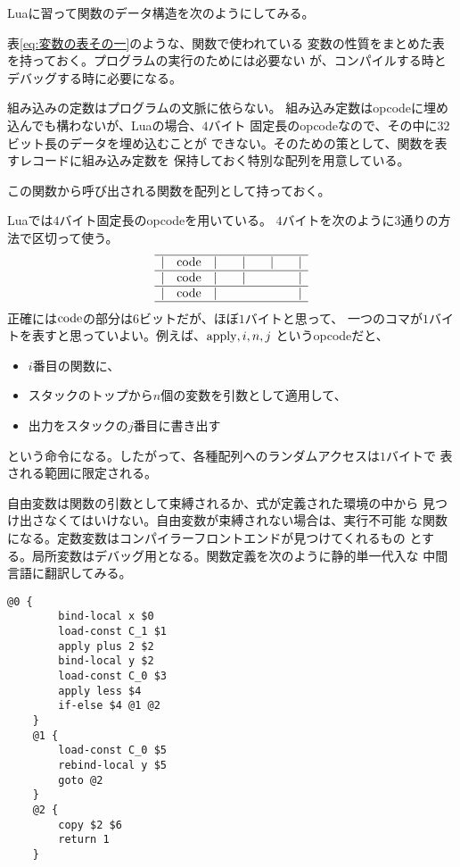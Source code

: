 {	Luaに習って関数のデータ構造を次のようにしてみる。
	\begin{description}\setlength{\itemsep}{-1mm} %
		\item[変数の表] 表\ref{eq:変数の表その一}のような、関数で使われている
		変数の性質をまとめた表を持っておく。プログラムの実行のためには必要ない
		が、コンパイルする時とデバッグする時に必要になる。
		\item[組み込み定数の配列] 組み込みの定数はプログラムの文脈に依らない。
		組み込み定数はopcodeに埋め込んでも構わないが、Luaの場合、$4$バイト
		固定長のopcodeなので、その中に$32$ビット長のデータを埋め込むことが
		できない。そのための策として、関数を表すレコードに組み込み定数を
		保持しておく特別な配列を用意している。
		\item[関数の配列] この関数から呼び出される関数を配列として持っておく。
		\item[opcodeの配列] Luaでは$4$バイト固定長のopcodeを用いている。
		$4$バイトを次のように$3$通りの方法で区切って使う。
		\begin{equation*}\begin{array}{lrrrrr}\hline
			|& {\operatorname{code}} &| \quad &| \quad &| \quad &| \\\hline
			|& {\operatorname{code}} &| \quad &| \quad & \quad &| \\\hline
			|& {\operatorname{code}} &| \quad & \quad & \quad &| \\\hline
		\end{array}\end{equation*}
		正確には${\operatorname{code}}$の部分は$6$ビットだが、ほぼ$1$バイトと思って、
		一つのコマが$1$バイトを表すと思っていよい。例えば、${\operatorname{apply}},i,n,j$
		というopcodeだと、
		\begin{itemize}\setlength{\itemsep}{-1mm} %
			\item $i$番目の関数に、
			\item スタックのトップから$n$個の変数を引数として適用して、
			\item 出力をスタックの$j$番目に書き出す
		\end{itemize} %
		という命令になる。したがって、各種配列へのランダムアクセスは$1$バイトで
		表される範囲に限定される。
	\end{description} %

	自由変数は関数の引数として束縛されるか、式が定義された環境の中から
	見つけ出さなくてはいけない。自由変数が束縛されない場合は、実行不可能
	な関数になる。定数変数はコンパイラーフロントエンドが見つけてくれるもの
	とする。局所変数はデバッグ用となる。関数定義を次のように静的単一代入な
	中間言語に翻訳してみる。
	\begin{lstlisting}[caption=中間言語その一, label=code:中間言語その一]
	@0 {
		bind-local x $0
		load-const C_1 $1
		apply plus 2 $2
		bind-local y $2
		load-const C_0 $3
		apply less $4
		if-else $4 @1 @2
	}
	@1 {
		load-const C_0 $5
		rebind-local y $5
		goto @2
	}
	@2 {
		copy $2 $6
		return 1
	}
	\end{lstlisting}

}
